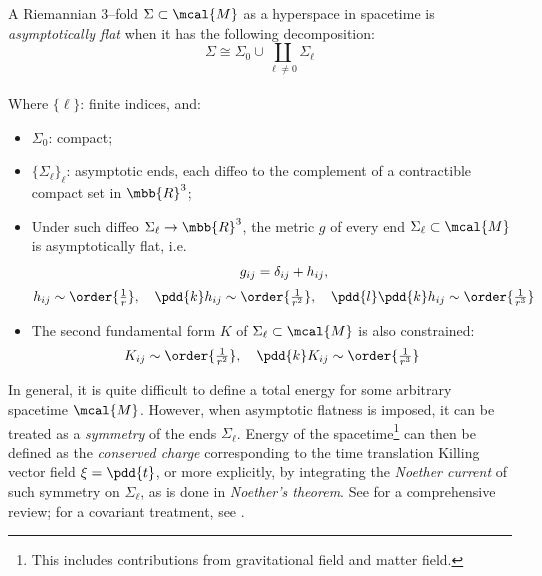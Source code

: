 \documentclass[a4paper,11pt]{article}
\begin{document}
	\begin{definition*}
		A Riemannian 3--fold $\Sigma\subset\mcal{M}$ as a hyperspace in spacetime is \textit{asymptotically flat} when it has the following decomposition:
		\begin{equation}
			\Sigma
			\cong \Sigma_0
			\cup \coprod_{\ell\ne 0} \Sigma_\ell
		\end{equation}%
\pagebreak[4]\\
		Where $\{\ell\}$: finite indices, and:
		\begin{itemize}[noitemsep,topsep=.3\baselineskip]
		\item $\Sigma_0$: compact;
		\item $\{\Sigma_\ell\}_\ell$: asymptotic ends, each diffeo to the complement of a contractible compact set in $\mbb{R}^3$; 
		\item Under such diffeo $\Sigma_\ell\to\mbb{R}^3$, the metric $g$ of every end $\Sigma_\ell\subset\mcal{M}$ is asymptotically flat, i.e.
		\begin{equation}
		\begin{gathered}
			g_{ij} = \delta_{ij} + h_{ij},\\[.5ex]
			h_{ij}
				\sim \order{\tfrac{1}{r}},\quad
			\pdd{k} h_{ij}
				\sim \order{\tfrac{1}{r^2}},\quad
			\pdd{l}\pdd{k} h_{ij}
				\sim \order{\tfrac{1}{r^3}}
		\end{gathered}
		\end{equation}
		\item The second fundamental form $K$ of $\Sigma_\ell\subset\mcal{M}$ is also constrained:
		\begin{equation}
			K_{ij}
				\sim \order{\tfrac{1}{r^2}},\quad
			\pdd{k} K_{ij}
				\sim \order{\tfrac{1}{r^3}}
		\end{equation}
		\end{itemize}
	\end{definition*}
	
	In general, it is quite difficult to define a total energy for some arbitrary spacetime $\mcal{M}$. However, when asymptotic flatness is imposed, it can be treated as a \textit{symmetry} of the ends $\Sigma_\ell$. Energy of the spacetime\footnote{
		This includes contributions from gravitational field and matter field.
	} can then be defined as the \textit{conserved charge} corresponding to the time translation Killing vector field $\xi = \pdd{t}$, or more explicitly, by integrating the \textit{Noether current} of such symmetry on $\Sigma_\ell$, as is done in \textit{Noether's theorem}. See \cite{Banados:2016zim} for a comprehensive review; for a covariant treatment, see \cite{crnkovic1987covariant,Harlow:2019yfa}. 
	
\end{document}
